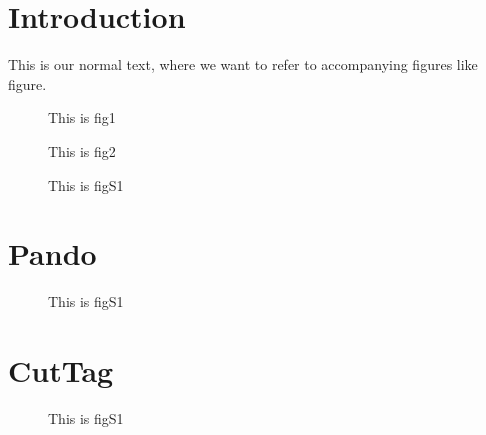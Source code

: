 \documentclass[12pt, a4paper, twoside]{article}
\newcounter{maincounter}
\newcounter{suppcounter}
\renewcommand{\thefigure}{\arabic{maincounter}}
\begin{document}
\section{Introduction}
This is our normal text, where we want to refer to accompanying figures like figure.

\begin{figure}
    \caption{This is fig1}
\end{figure}

\begin{figure}
    \caption{This is fig2}
\end{figure}


\renewcommand{\thefigure}{S\arabic{suppcounter}}


\begin{figure}
    \caption{This is figS1}
\end{figure}


\section{Pando}
\begin{figure}
    \caption{This is figS1}
\end{figure}

\section{CutTag}
\begin{figure}
    \caption{This is figS1}
\end{figure}
\end{document}
